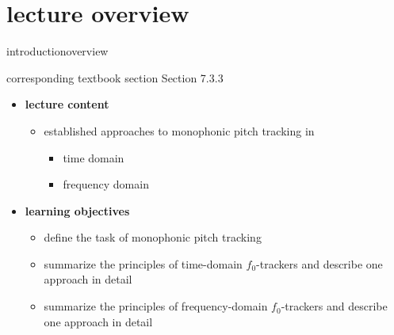 


\subtitle{Module 7.3.3: Fundamental Frequency Detection in Monophonic Signals}


	

    \section[overview]{lecture overview}
        \begin{frame}{introduction}{overview}
            \begin{block}{corresponding textbook section}
                    Section 7.3.3
            \end{block}

            \begin{itemize}
                \item   \textbf{lecture content}
                    \begin{itemize}
                        \item   established approaches to monophonic pitch tracking in
                            \begin{itemize}
                                \item   time domain
                                \item   frequency domain
                            \end{itemize}
                    \end{itemize}
                \bigskip
                \item<2->   \textbf{learning objectives}
                    \begin{itemize}
                        \item   define the task of monophonic pitch tracking
                        \item   summarize the principles of time-domain $f_0$-trackers and describe one approach in detail
                        \item   summarize the principles of frequency-domain $f_0$-trackers and describe one approach in detail
                    \end{itemize}
            \end{itemize}
        \end{frame}


